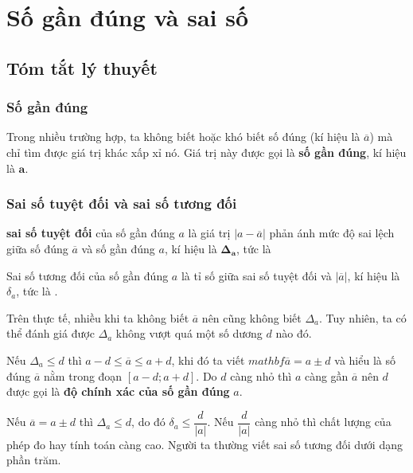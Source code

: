 \section{Số gần đúng và sai số}
\subsection{Tóm tắt lý thuyết}
\subsubsection{Số gần đúng}
	\begin{boxdn}
	Trong nhiều trường hợp, ta không biết hoặc khó biết số đúng (kí hiệu là $\overline{a}$) mà chỉ tìm được giá trị khác xấp xỉ nó. Giá trị này được gọi là \textbf{số gần đúng}, kí hiệu là $\mathbf{a}$.
	\end{boxdn}	
\subsubsection{Sai số tuyệt đối và sai số tương đối}
\begin{boxdn}
	\textbf{sai số tuyệt đối} của số gần đúng $a$ là giá trị $|a-\overline{a}|$ phản ánh mức độ sai lệch giữa số đúng $\overline{a}$ và số gần đúng $a$, kí hiệu là $\mathbf{\Delta_a}$, tức là 
\end{boxdn}
\begin{boxdn}
	Sai số tương đối của số gần đúng $a$ là tỉ số giữa sai số tuyệt đối và $|\overline{a}|$, kí hiệu là $\delta_a$, tức là .
\end{boxdn}
Trên thực tế, nhiều khi ta không biết $\overline{a}$ nên cũng không biết $\Delta_a$. Tuy nhiên, ta có thể đánh giá được $\Delta_a$ không vượt quá một số dương $d$ nào đó.
\begin{boxdn}
	Nếu $\Delta_{a} \leq d$ thì $a-d \le \overline{a} \le a+d$, khi đó ta viết $mathbf{\overline{a}=a \pm d}$ và hiểu là số đúng $\overline{a}$ nằm trong đoạn $[a-d; a+d]$. Do $d$ càng nhỏ thì $a$ càng gần $\overline{a}$ nên $d$ được gọi là \textbf{độ chính xác của số gần đúng} $a$.
\end{boxdn}
\begin{nx}
Nếu $\overline{a}=a \pm d$ thì $\Delta_a \leq d$, do đó $\delta_a \leq \dfrac{d}{|a|}$. Nếu $\dfrac{d}{|a|}$ càng nhỏ thì chất lượng của phép đo hay tính toán càng cao. Người ta thường viết sai số tương đối dưới dạng phần trăm.	
\end{nx}
